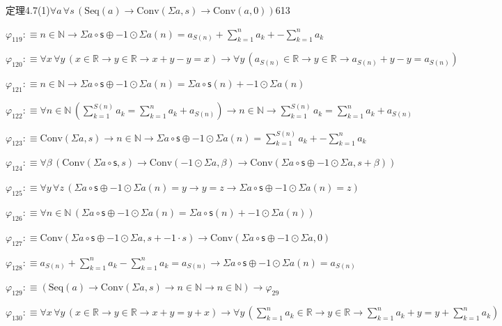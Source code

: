 \begin{fullproof}{定理4.7(1)}{$\forall a\,\forall s\,(\mathrm{Seq}(a) \to \mathrm{Conv}(\Sigma a,s) \to \mathrm{Conv}(a,0))$}{613}
\begin{abbrevlist}
\item $\varphi_{119} :\equiv n \in \mathbb{N} \to \Sigma a \circ \mathsf{s} \oplus -1 \odot \Sigma a(n) = a_{S(n)} + {\textstyle\sum_{k=1}^{n} a_{k}} + -{\textstyle\sum_{k=1}^{n} a_{k}}$
\item $\varphi_{120} :\equiv \forall x\,\forall y\,(x \in \mathbb{R} \to y \in \mathbb{R} \to x + y - y = x) \to \forall y\,(a_{S(n)} \in \mathbb{R} \to y \in \mathbb{R} \to a_{S(n)} + y - y = a_{S(n)})$
\item $\varphi_{121} :\equiv n \in \mathbb{N} \to \Sigma a \circ \mathsf{s} \oplus -1 \odot \Sigma a(n) = \Sigma a \circ \mathsf{s}(n) + -1 \odot \Sigma a(n)$
\item $\varphi_{122} :\equiv \forall n \in \mathbb{N}\,({\textstyle\sum_{k=1}^{S(n)} a_{k}} = {\textstyle\sum_{k=1}^{n} a_{k}} + a_{S(n)}) \to n \in \mathbb{N} \to {\textstyle\sum_{k=1}^{S(n)} a_{k}} = {\textstyle\sum_{k=1}^{n} a_{k}} + a_{S(n)}$
\item $\varphi_{123} :\equiv \mathrm{Conv}(\Sigma a,s) \to n \in \mathbb{N} \to \Sigma a \circ \mathsf{s} \oplus -1 \odot \Sigma a(n) = {\textstyle\sum_{k=1}^{S(n)} a_{k}} + -{\textstyle\sum_{k=1}^{n} a_{k}}$
\item $\varphi_{124} :\equiv \forall \beta\,(\mathrm{Conv}(\Sigma a \circ \mathsf{s},s) \to \mathrm{Conv}(-1 \odot \Sigma a,\beta) \to \mathrm{Conv}(\Sigma a \circ \mathsf{s} \oplus -1 \odot \Sigma a,s + \beta))$
\item $\varphi_{125} :\equiv \forall y\,\forall z\,(\Sigma a \circ \mathsf{s} \oplus -1 \odot \Sigma a(n) = y \to y = z \to \Sigma a \circ \mathsf{s} \oplus -1 \odot \Sigma a(n) = z)$
\item $\varphi_{126} :\equiv \forall n \in \mathbb{N}\,(\Sigma a \circ \mathsf{s} \oplus -1 \odot \Sigma a(n) = \Sigma a \circ \mathsf{s}(n) + -1 \odot \Sigma a(n))$
\item $\varphi_{127} :\equiv \mathrm{Conv}(\Sigma a \circ \mathsf{s} \oplus -1 \odot \Sigma a,s + -1 \cdot s) \to \mathrm{Conv}(\Sigma a \circ \mathsf{s} \oplus -1 \odot \Sigma a,0)$
\item $\varphi_{128} :\equiv a_{S(n)} + {\textstyle\sum_{k=1}^{n} a_{k}} - {\textstyle\sum_{k=1}^{n} a_{k}} = a_{S(n)} \to \Sigma a \circ \mathsf{s} \oplus -1 \odot \Sigma a(n) = a_{S(n)}$
\item $\varphi_{129} :\equiv (\mathrm{Seq}(a) \to \mathrm{Conv}(\Sigma a,s) \to n \in \mathbb{N} \to n \in \mathbb{N}) \to \varphi_{29}$
\item $\varphi_{130} :\equiv \forall x\,\forall y\,(x \in \mathbb{R} \to y \in \mathbb{R} \to x + y = y + x) \to \forall y\,({\textstyle\sum_{k=1}^{n} a_{k}} \in \mathbb{R} \to y \in \mathbb{R} \to {\textstyle\sum_{k=1}^{n} a_{k}} + y = y + {\textstyle\sum_{k=1}^{n} a_{k}})$

\end{abbrevlist}
\end{fullproof}
